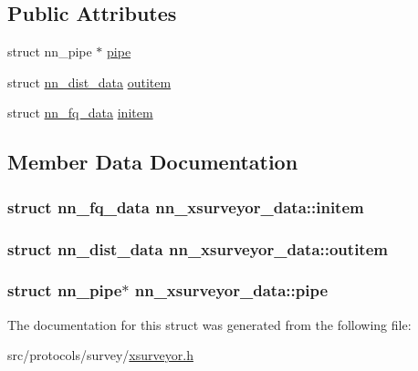 \subsection*{Public Attributes}
\begin{DoxyCompactItemize}
\item 
struct nn\+\_\+pipe $\ast$ \hyperlink{structnn__xsurveyor__data_ae62451255efaf6d2c6d82f90563c4c0a}{pipe}
\item 
struct \hyperlink{structnn__dist__data}{nn\+\_\+dist\+\_\+data} \hyperlink{structnn__xsurveyor__data_a19cc420e9b15b585db99d1027923c669}{outitem}
\item 
struct \hyperlink{structnn__fq__data}{nn\+\_\+fq\+\_\+data} \hyperlink{structnn__xsurveyor__data_aa8ee33fc02c7402fdb06e243113273bc}{initem}
\end{DoxyCompactItemize}


\subsection{Member Data Documentation}
\subsubsection[{initem}]{\setlength{\rightskip}{0pt plus 5cm}struct {\bf nn\+\_\+fq\+\_\+data} nn\+\_\+xsurveyor\+\_\+data\+::initem}\hypertarget{structnn__xsurveyor__data_aa8ee33fc02c7402fdb06e243113273bc}{}\label{structnn__xsurveyor__data_aa8ee33fc02c7402fdb06e243113273bc}
\subsubsection[{outitem}]{\setlength{\rightskip}{0pt plus 5cm}struct {\bf nn\+\_\+dist\+\_\+data} nn\+\_\+xsurveyor\+\_\+data\+::outitem}\hypertarget{structnn__xsurveyor__data_a19cc420e9b15b585db99d1027923c669}{}\label{structnn__xsurveyor__data_a19cc420e9b15b585db99d1027923c669}
\subsubsection[{pipe}]{\setlength{\rightskip}{0pt plus 5cm}struct nn\+\_\+pipe$\ast$ nn\+\_\+xsurveyor\+\_\+data\+::pipe}\hypertarget{structnn__xsurveyor__data_ae62451255efaf6d2c6d82f90563c4c0a}{}\label{structnn__xsurveyor__data_ae62451255efaf6d2c6d82f90563c4c0a}


The documentation for this struct was generated from the following file\+:\begin{DoxyCompactItemize}
\item 
src/protocols/survey/\hyperlink{xsurveyor_8h}{xsurveyor.\+h}\end{DoxyCompactItemize}
